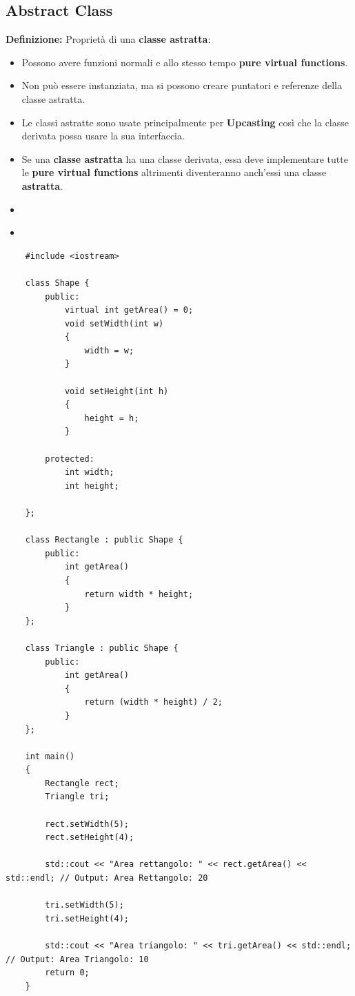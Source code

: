 \subsection{Abstract Class}

\textsf{\small \textbf{Definizione: } Proprietà di una \textbf{classe astratta}: } \\

\begin{itemize}
	\item \textsf{\small Possono avere funzioni normali e allo stesso tempo \textbf{pure virtual functions}.}
	\item \textsf{\small Non può essere instanziata, ma si possono creare puntatori e referenze della classe astratta.}
	\item \textsf{\small Le classi astratte sono usate principalmente per \textbf{Upcasting} così che la classe derivata possa usare la sua interfaccia.}
	\item \textsf{\small Se una \textbf{classe astratta} ha una classe derivata, essa deve implementare tutte le \textbf{pure virtual functions} altrimenti diventeranno anch'essi una classe \textbf{astratta}.}
	\item \textsf{\small }
	\item \textsf{\small }
\end{itemize}

\begin{lstlisting}
	#include <iostream>
	
	class Shape {
		public:
			virtual int getArea() = 0;
			void setWidth(int w)
			{
				width = w;
			}
		
			void setHeight(int h)
			{
				height = h;
			}
		
		protected:
			int width;
			int height;
			
	};

	class Rectangle : public Shape {
		public:
			int getArea()
			{
				return width * height;
			}
	};

	class Triangle : public Shape {
		public:
			int getArea()
			{
				return (width * height) / 2;
			}
	};

	int main()
	{
		Rectangle rect;
		Triangle tri;
		
		rect.setWidth(5);
		rect.setHeight(4);
		
		std::cout << "Area rettangolo: " << rect.getArea() << std::endl; // Output: Area Rettangolo: 20
		
		tri.setWidth(5);
		tri.setHeight(4);
		
		std::cout << "Area triangolo: " << tri.getArea() << std::endl; // Output: Area Triangolo: 10
		return 0;
	}
\end{lstlisting}

